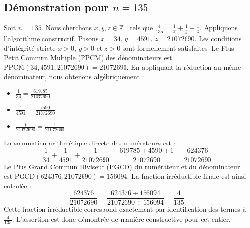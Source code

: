 \documentclass[11pt,a4paper]{article}
\begin{document}
\subsection{Démonstration pour $n = 135$}
Soit $n = 135$. Nous cherchons $x, y, z \in \mathbb{Z}^{+}$ tels que $\frac{4}{135} = \frac{1}{x} + \frac{1}{y} + \frac{1}{z}$.
Appliquons l'algorithme constructif. Posons $x = 34$, $y = 4591$, $z = 21072690$.
Les conditions d'intégrité stricte $x > 0$, $y > 0$ et $z > 0$ sont formellement satisfaites.
Le Plus Petit Commun Multiple (PPCM) des dénominateurs est $\text{PPCM}(34, 4591, 21072690) = 21072690$.
En appliquant la réduction au même dénominateur, nous obtenons algébriquement :
\begin{itemize}
    \item $\frac{1}{34} = \frac{619785}{21072690}$
    \item $\frac{1}{4591} = \frac{4590}{21072690}$
    \item $\frac{1}{21072690} = \frac{1}{21072690}$
\end{itemize}
La sommation arithmétique directe des numérateurs est :
$$ \frac{1}{34} + \frac{1}{4591} + \frac{1}{21072690} = \frac{619785 + 4590 + 1}{21072690} = \frac{624376}{21072690} $$
Le Plus Grand Commun Diviseur (PGCD) du numérateur et du dénominateur est $\text{PGCD}(624376, 21072690) = 156094$.
La fraction irréductible finale est ainsi calculée :
$$ \frac{624376}{21072690} = \frac{624376 \div 156094}{21072690 \div 156094} = \frac{4}{135} $$
Cette fraction irréductible correspond exactement par identification des termes à $\frac{4}{135}$. L'assertion est donc démontrée de manière constructive pour cet entier.
\end{document}
